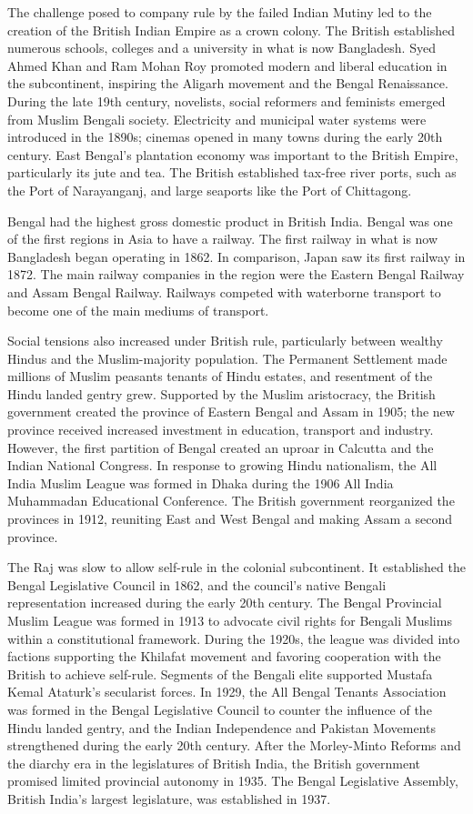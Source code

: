 The challenge posed to company rule by the failed Indian Mutiny led to
the creation of the British Indian Empire as a crown colony. The British
established numerous schools, colleges and a university in what is now
Bangladesh. Syed Ahmed Khan and Ram Mohan Roy promoted modern and
liberal education in the subcontinent, inspiring the Aligarh movement
and the Bengal Renaissance. During the late 19th century, novelists,
social reformers and feminists emerged from Muslim Bengali society.
Electricity and municipal water systems were introduced in the 1890s;
cinemas opened in many towns during the early 20th century. East
Bengal's plantation economy was important to the British Empire,
particularly its jute and tea. The British established tax-free river
ports, such as the Port of Narayanganj, and large seaports like the Port
of Chittagong.

Bengal had the highest gross domestic product in British India. Bengal
was one of the first regions in Asia to have a railway. The first
railway in what is now Bangladesh began operating in 1862. In
comparison, Japan saw its first railway in 1872. The main railway
companies in the region were the Eastern Bengal Railway and Assam Bengal
Railway. Railways competed with waterborne transport to become one of
the main mediums of transport.

Social tensions also increased under British rule, particularly between
wealthy Hindus and the Muslim-majority population. The Permanent
Settlement made millions of Muslim peasants tenants of Hindu estates,
and resentment of the Hindu landed gentry grew. Supported by the Muslim
aristocracy, the British government created the province of Eastern
Bengal and Assam in 1905; the new province received increased investment
in education, transport and industry. However, the first partition of
Bengal created an uproar in Calcutta and the Indian National Congress.
In response to growing Hindu nationalism, the All India Muslim League
was formed in Dhaka during the 1906 All India Muhammadan Educational
Conference. The British government reorganized the provinces in 1912,
reuniting East and West Bengal and making Assam a second province.

The Raj was slow to allow self-rule in the colonial subcontinent. It
established the Bengal Legislative Council in 1862, and the council's
native Bengali representation increased during the early 20th century.
The Bengal Provincial Muslim League was formed in 1913 to advocate civil
rights for Bengali Muslims within a constitutional framework. During the
1920s, the league was divided into factions supporting the Khilafat
movement and favoring cooperation with the British to achieve self-rule.
Segments of the Bengali elite supported Mustafa Kemal Ataturk's
secularist forces. In 1929, the All Bengal Tenants Association was
formed in the Bengal Legislative Council to counter the influence of the
Hindu landed gentry, and the Indian Independence and Pakistan Movements
strengthened during the early 20th century. After the Morley-Minto
Reforms and the diarchy era in the legislatures of British India, the
British government promised limited provincial autonomy in 1935. The
Bengal Legislative Assembly, British India's largest legislature, was
established in 1937.


